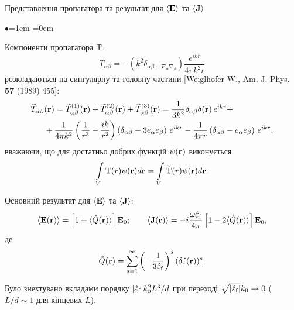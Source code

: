 \documentclass[10pt]{beamer}
\begin{document}
\begin{frame}{Представлення пропагатора та результат для $\langle {\bf E} \rangle$ та $\langle {\bf J} \rangle$}
\footnotesize

\begin{list}{$\bullet$}{\leftmargin=1em \itemindent=0em}
\item
Компоненти пропагатора $\rm T$:
$$
    T_{\alpha\beta} = -(k^2 \delta_{\alpha\beta + \nabla_\alpha\nabla_\beta}) \frac{e^{ikr}}{4\pi k^2 r}
$$
розкладаються на сингулярну та головну частини [Weiglhofer W., Am. J. Phys. {\bf 57} (1989) 455]:
\begin{equation}\label{eq:propagator-CGA}
\begin{split}
{\widetilde T}_{\alpha\beta} &({\rm {\bf r}})
= {\widetilde T}_{\alpha\beta}^{(1)} ({\rm {\bf r}}) +
{\widetilde T}_{\alpha\beta}^{(2)} ({\rm {\bf r}}) +
{\widetilde T}_{\alpha\beta}^{(3)} ({\rm {\bf r}})
= \frac{1}{3k^{2}} \delta_{\alpha\beta} \delta ({\rm
	{\bf r}})\,e^{ikr} + \\
&+ \frac{1}{4\pi k^{2}}
\left(\frac{1}{r^3}-\frac{ik}{r^2}\right)
\left( \delta _{\alpha\beta} - 3e_{\alpha} e_{\beta}
\right)\,e^{ikr} - \frac{1}{4\pi r}\left( {\delta
	_{\alpha\beta} - e_{\alpha} e_{\beta}} \right)\,e^{ikr},
\end{split}
\end{equation}
вважаючи, що для достатньо добрих функцій $\psi({\bf r})$ виконується
$$
    \int\limits_V {\rm T}(r) \psi({\bf r}) d{\bf r} = \int\limits_V {\widetilde{\rm T}}(r) \psi({\bf r}) d{\bf r}.
$$

\item
Основний результат для $\langle {\bf E} \rangle$ та $\langle {\bf J} \rangle$:
\begin{equation}\label{eq:E_average-J_average}
\langle {\bf E} ({\bf r}) \rangle = \left[ 1 + \langle \hat{Q}({\bf r}) \rangle \right] {\bf E}_0;
\qquad 
\langle {\bf J} ({\bf r}) \rangle = - i \frac{\omega\hat{\varepsilon}_{\rm f}}{4\pi} \left[ 1 - 2\langle \hat{Q}({\bf r}) \rangle \right] {\bf E}_0,
\end{equation}
де
\begin{equation}\label{eq:Q-sum}
\hat{Q}({\bf r}) = \sum\limits_{s=1}^{\infty} \left( - \frac{1}{3\hat{\varepsilon}_{\rm f}} \right)^s (\delta\hat{\varepsilon}({\bf r}))^s.
\end{equation}

Було знехтувано вкладами порядку $|\hat{\varepsilon}_{\rm f}|k_0^2 L^3/d$ при переході $\sqrt{|\hat{\varepsilon}_{\rm f}|}k_0 \to 0$ ($L/d \sim 1$ для кінцевих $L$).

\end{list}

\end{frame}
\end{document}

